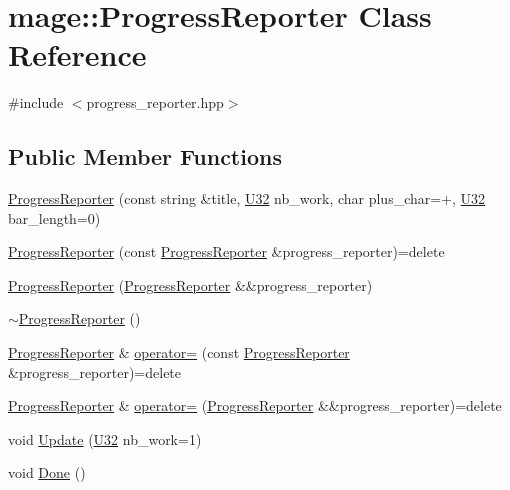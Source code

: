 \hypertarget{classmage_1_1_progress_reporter}{}\section{mage\+:\+:Progress\+Reporter Class Reference}
\label{classmage_1_1_progress_reporter}


{\ttfamily \#include $<$progress\+\_\+reporter.\+hpp$>$}

\subsection*{Public Member Functions}
\begin{DoxyCompactItemize}
\item 
\hyperlink{classmage_1_1_progress_reporter_a9b218a43aa52a644aa92ada4a0ac50e3}{Progress\+Reporter} (const string \&title, \hyperlink{namespacemage_a41c104c036fba3756a74e19f793eeaa1}{U32} nb\+\_\+work, char plus\+\_\+char=\textquotesingle{}+\textquotesingle{}, \hyperlink{namespacemage_a41c104c036fba3756a74e19f793eeaa1}{U32} bar\+\_\+length=0)
\item 
\hyperlink{classmage_1_1_progress_reporter_a59c1ca6e4c0d480a1726d79ef6d42e74}{Progress\+Reporter} (const \hyperlink{classmage_1_1_progress_reporter}{Progress\+Reporter} \&progress\+\_\+reporter)=delete
\item 
\hyperlink{classmage_1_1_progress_reporter_a5e7036f1a90e019fc75b6afca4459a78}{Progress\+Reporter} (\hyperlink{classmage_1_1_progress_reporter}{Progress\+Reporter} \&\&progress\+\_\+reporter)
\item 
\hyperlink{classmage_1_1_progress_reporter_aa543239c6dd4474a77cf4cf6904c1b26}{$\sim$\+Progress\+Reporter} ()
\item 
\hyperlink{classmage_1_1_progress_reporter}{Progress\+Reporter} \& \hyperlink{classmage_1_1_progress_reporter_a7bc52147f6d2e30d897f512f910c8917}{operator=} (const \hyperlink{classmage_1_1_progress_reporter}{Progress\+Reporter} \&progress\+\_\+reporter)=delete
\item 
\hyperlink{classmage_1_1_progress_reporter}{Progress\+Reporter} \& \hyperlink{classmage_1_1_progress_reporter_aba75cd5ea2d9faae4264b844f857e260}{operator=} (\hyperlink{classmage_1_1_progress_reporter}{Progress\+Reporter} \&\&progress\+\_\+reporter)=delete
\item 
void \hyperlink{classmage_1_1_progress_reporter_a62009a4466cdd2766afee0da34338338}{Update} (\hyperlink{namespacemage_a41c104c036fba3756a74e19f793eeaa1}{U32} nb\+\_\+work=1)
\item 
void \hyperlink{classmage_1_1_progress_reporter_a11d758647ac2082bc296ab53a7454eaa}{Done} ()
\end{DoxyCompactItemize}
